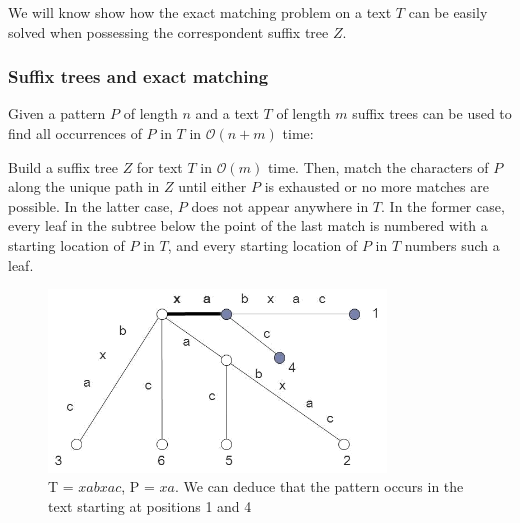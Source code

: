 \documentclass[a4paper,12pt, oneside]{article}
\begin{document}
We will know show how the exact matching problem on a text $T$ can be easily solved when possessing the correspondent suffix tree $Z$.

\subsubsection{Suffix trees and exact matching}
Given a pattern $P$ of length $n$ and a text $T$ of length $m$ suffix trees can be used to find all occurrences of $P$ in $T$ in $\mathcal{O}(n + m)$ time:


\begin{displayquote}
Build a suffix tree $Z$ for text $T$ in $\mathcal{O}(m)$ time. Then, match the characters of $P$ along the unique path in $Z$ until either $P$ is exhausted or no more matches are possible. In the latter case, $P$ does not appear anywhere in $T$. In the former case, every leaf in the subtree below the point of the last match is numbered with a starting location of $P$ in $T$, and every starting location of $P$ in $T$ numbers such a leaf. \cite{gusfield}
\end{displayquote}

\begin{figure}
	\includegraphics[width=0.8\textwidth]{suffix-trees-pattern-matching.png}
	\centering
	\caption{T = $xabxac$, P = $xa$. We can deduce that the pattern occurs in the text starting at positions 1 and 4}
	\label{fig:suffixtreematching}
\end{figure}
\end{document}
